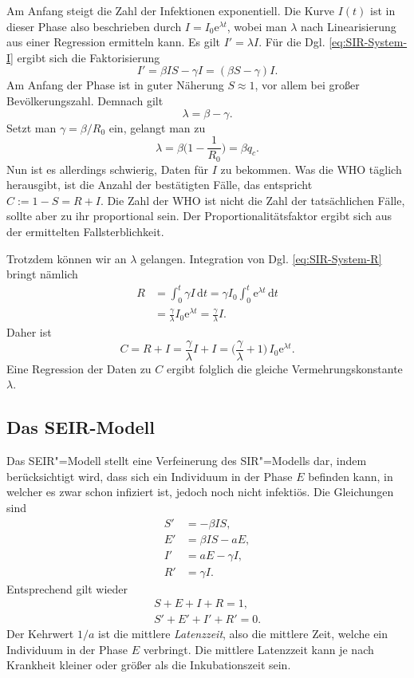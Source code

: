 \documentclass[a4paper,11pt,fleqn,twocolumn,twoside,dvipdfmx]{scrartcl}
\numberwithin{equation}{section}
\newcommand{\ee}{\mathrm e}
\begin{document}
Am Anfang steigt die Zahl der Infektionen exponentiell. Die Kurve
$I(t)$ ist in dieser Phase also beschrieben durch
$I=I_0\ee^{\lambda t}$, wobei man $\lambda$ nach Linearisierung aus
einer Regression ermitteln kann. Es gilt $I'=\lambda I$. Für die
Dgl. \eqref{eq:SIR-System-I} ergibt sich die Faktorisierung%
\begin{equation}
I' = \beta IS-\gamma I = (\beta S-\gamma)I.
\end{equation}
Am Anfang der Phase ist in guter Näherung $S\approx 1$, vor allem bei
großer Bevölkerungszahl. Demnach gilt%
\begin{equation}
\lambda = \beta-\gamma.
\end{equation}
Setzt man $\gamma=\beta/R_0$ ein, gelangt man zu%
\begin{equation}
\lambda = \beta\Big(1-\frac{1}{R_0}\Big) = \beta q_c.
\end{equation}
Nun ist es allerdings schwierig, Daten für $I$ zu bekommen. Was die
WHO täglich herausgibt, ist die Anzahl der bestätigten Fälle, das
entspricht $C:=1-S=R+I$. Die Zahl der WHO ist nicht die Zahl der
tatsächlichen Fälle, sollte aber zu ihr proportional sein. Der
Proportionalitätsfaktor ergibt sich aus der ermittelten
Fallsterblichkeit.

Trotzdem können wir an $\lambda$ gelangen. Integration von Dgl.
\eqref{eq:SIR-System-R} bringt nämlich%
\begin{align}
R &= \int_0^t \gamma I\,\mathrm dt
= \gamma I_0 \int_0^t \ee^{\lambda t}\,\mathrm dt\\
&= \frac{\gamma}{\lambda} I_0\ee^{\lambda t} = \frac{\gamma}{\lambda} I.
\end{align}
Daher ist
\begin{equation}
C = R+I = \frac{\gamma}{\lambda} I+I
= \Big(\frac{\gamma}{\lambda}+1\Big)\,I_0\ee^{\lambda t}.
\end{equation}
Eine Regression der Daten zu $C$ ergibt folglich die gleiche
Vermehrungskonstante $\lambda$.

\subsection{Das SEIR-Modell}

Das SEIR"=Modell stellt eine Verfeinerung des SIR"=Modells dar, indem
berücksichtigt wird, dass sich ein Individuum in der
Phase $E$ befinden kann, in welcher es zwar schon infiziert ist,
jedoch noch nicht infektiös. Die Gleichungen sind%
\begin{align}
S' &= -\beta IS,\\
E' &= \beta IS-aE,\\
I' &= aE-\gamma I,\\
R' &= \gamma I.
\end{align}
Entsprechend gilt wieder
\begin{gather}
S+E+I+R=1,\\
S'+E'+I'+R'=0.
\end{gather}
Der Kehrwert $1/a$ ist die mittlere \emph{Latenzzeit}, also die mittlere
Zeit, welche ein Individuum in der Phase $E$ verbringt. Die mittlere
Latenzzeit kann je nach Krankheit kleiner oder größer als die
Inkubationszeit sein.
\end{document}
